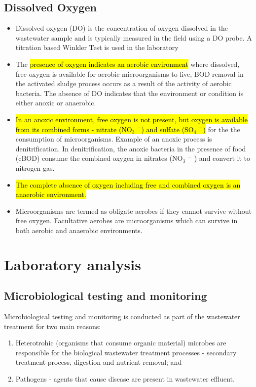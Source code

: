 \subsection{Dissolved Oxygen}	
			\begin{itemize}
				\item Dissolved oxygen (DO) is the concentration of oxygen dissolved in the wastewater sample and is typically measured in the field using a DO probe.  A titration based Winkler Test is used in the laboratory
				\item The \hl{presence of oxygen indicates an aerobic environment} where dissolved, free oxygen is available for aerobic microorganisms to live, BOD removal in the activated sludge process occurs as a result of the activity of aerobic bacteria.  The absence of DO indicates that the environment or condition is either anoxic or anaerobic.  
				\item \hl{In an anoxic environment, free oxygen is not present, but oxygen is available from its combined  forms - nitrate (NO$_3$ $^-$) and sulfate (SO$_4$ $^-$)} for the the consumption of microorganisms.  Example of an anoxic process is denitrification.  In denitrification, the anoxic bacteria in the presence of food (cBOD) consume the combined oxygen in nitrates (NO$_3$ $^-$ ) and convert it to nitrogen gas.
				\item \hl{The complete absence of oxygen including free and combined oxygen is an anaerobic environment.}
				\item Microorganisms are termed as obligate aerobes if they cannot survive without free oxygen.  Facultative aerobes are microorganisms which can survive in both aerobic and anaerobic environments.  
			\end{itemize}
		\section{Laboratory analysis}			
\subsection{Microbiological testing and monitoring}	
			
			Microbiological testing and monitoring is conducted as part of the wastewater treatment for two main reasons:
			\begin{enumerate}[1.]
				\item Heterotrohic (organisms that consume organic material) microbes are responsible for the biological wastewater treatment processes - secondary treatment process, digestion and nutrient removal; and
				\item Pathogens - agents that cause disease are present in wastewater effluent.
			\end{enumerate}

